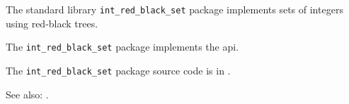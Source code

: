 

The standard library {\tt int\_red\_black\_set} package implements sets of integers using red-black trees.

The {\tt int\_red\_black\_set} package implements the  api.

The {\tt int\_red\_black\_set} package source code is in .

See also:  .



